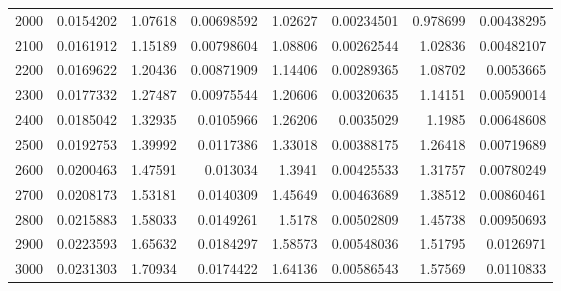 \begin{tabular}{rrrrrrrr}
          2000 &               0.0154202  &     1.07618  &        0.00698592  &     1.02627  &        0.00234501  &     0.978699 &      0.00438295  \\
          2100 &               0.0161912  &     1.15189  &        0.00798604  &     1.08806  &        0.00262544  &     1.02836  &      0.00482107  \\
          2200 &               0.0169622  &     1.20436  &        0.00871909  &     1.14406  &        0.00289365  &     1.08702  &      0.0053665   \\
          2300 &               0.0177332  &     1.27487  &        0.00975544  &     1.20606  &        0.00320635  &     1.14151  &      0.00590014  \\
          2400 &               0.0185042  &     1.32935  &        0.0105966   &     1.26206  &        0.0035029   &     1.1985   &      0.00648608  \\
          2500 &               0.0192753  &     1.39992  &        0.0117386   &     1.33018  &        0.00388175  &     1.26418  &      0.00719689  \\
          2600 &               0.0200463  &     1.47591  &        0.013034    &     1.3941   &        0.00425533  &     1.31757  &      0.00780249  \\
          2700 &               0.0208173  &     1.53181  &        0.0140309   &     1.45649  &        0.00463689  &     1.38512  &      0.00860461  \\
          2800 &               0.0215883  &     1.58033  &        0.0149261   &     1.5178   &        0.00502809  &     1.45738  &      0.00950693  \\
          2900 &               0.0223593  &     1.65632  &        0.0184297   &     1.58573  &        0.00548036  &     1.51795  &      0.0126971   \\
          3000 &               0.0231303  &     1.70934  &        0.0174422   &     1.64136  &        0.00586543  &     1.57569  &      0.0110833   \\
\hline
\end{tabular}